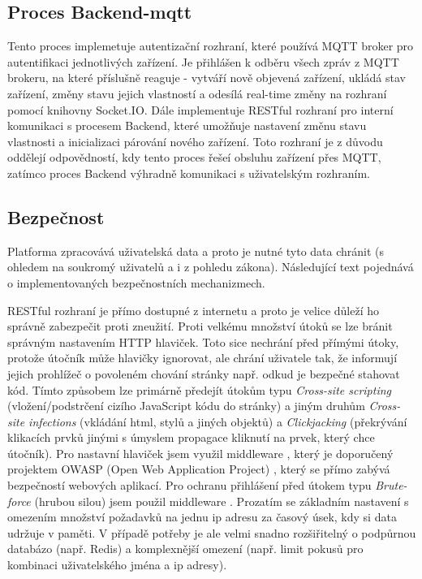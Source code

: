 \subsection{Proces Backend-mqtt}
Tento proces implemetuje autentizační rozhraní, které používá MQTT broker pro autentifikaci jednotlivých zařízení. Je přihlášen k odběru všech zpráv z MQTT brokeru, na které příslušně reaguje - vytváří nově objevená zařízení, ukládá stav zařízení, změny stavu jejich vlastností a odesílá real-time změny na rozhraní pomocí knihovny Socket.IO. Dále implementuje RESTful rozhraní pro interní komunikaci s procesem Backend, které umožňuje nastavení změnu stavu vlastnosti a inicializaci párování nového zařízení. Toto rozhraní je z důvodu oddělejí odpovědností, kdy tento proces řešeí obsluhu zařízení přes MQTT, zatímco proces Backend výhradně komunikaci s uživatelským rozhraním.


\subsection{Bezpečnost}
Platforma zpracovává uživatelská data a proto je nutné tyto data chránit (s ohledem na soukromý uživatelů a i z pohledu zákona). Následující text pojednává o implementovaných bezpečnostních mechanizmech.

RESTful rozhraní je přímo dostupné z internetu a proto je velice důleží ho správně zabezpečit proti zneužití. Proti velkému množství útoků se lze bránit správným nastavením HTTP hlaviček. Toto sice nechrání před přímými útoky, protože útočník může hlavičky ignorovat, ale chrání uživatele tak, že informují jejich prohlížeč o povoleném chování stránky např. odkud je bezpečné stahovat kód. Tímto způsobem lze primárně předejít útokům typu \textit{Cross-site scripting} (vložení/podstrčení cizího JavaScript kódu do stránky) a jiným druhům \textit{Cross-site infections} (vkládání html, stylů a jiných objektů) a \textit{Clickjacking} (překrývání klikacích prvků jinými s úmyslem propagace kliknutí na prvek, který chce útočník). Pro nastavní hlaviček jsem využil middleware , který je doporučený projektem OWASP (Open Web Application Project) \cite{owasp-cheatsheets}, který se přímo zabývá bezpečností webových aplikací. Pro ochranu přihlášení před útokem typu \textit{Brute-force} (hrubou silou) jsem použil middleware . Prozatím se základním nastavení s omezením množství požadavků na jednu ip adresu za časový úsek, kdy si data udržuje v paměti. V případě potřeby je ale velmi snadno rozšiřitelný o podpůrnou databázo (např. Redis) a komplexnější omezení (např. limit pokusů pro kombinaci uživatelského jména a ip adresy).

